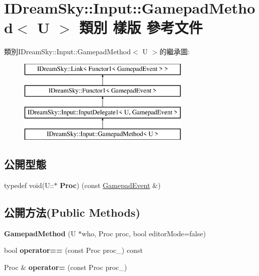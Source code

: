 \hypertarget{class_i_dream_sky_1_1_input_1_1_gamepad_method}{}\section{I\+Dream\+Sky\+:\+:Input\+:\+:Gamepad\+Method$<$ U $>$ 類別 樣版 參考文件}
\label{class_i_dream_sky_1_1_input_1_1_gamepad_method}
類別\+I\+Dream\+Sky\+:\+:Input\+:\+:Gamepad\+Method$<$ U $>$的繼承圖\+:\begin{figure}[H]
\begin{center}
\leavevmode
\includegraphics[height=4.000000cm]{class_i_dream_sky_1_1_input_1_1_gamepad_method}
\end{center}
\end{figure}
\subsection*{公開型態}
\begin{DoxyCompactItemize}
\item 
typedef void(U\+::$\ast$ {\bfseries Proc}) (const \hyperlink{class_i_dream_sky_1_1_input_1_1_gamepad_event}{Gamepad\+Event} \&)\hypertarget{class_i_dream_sky_1_1_input_1_1_gamepad_method_ab743cde604d2da741f306c7950c1ef01}{}\label{class_i_dream_sky_1_1_input_1_1_gamepad_method_ab743cde604d2da741f306c7950c1ef01}

\end{DoxyCompactItemize}
\subsection*{公開方法(Public Methods)}
\begin{DoxyCompactItemize}
\item 
{\bfseries Gamepad\+Method} (U $\ast$who, Proc proc, bool editor\+Mode=false)\hypertarget{class_i_dream_sky_1_1_input_1_1_gamepad_method_aac28e07d9407986fa910ce849e0fb7f2}{}\label{class_i_dream_sky_1_1_input_1_1_gamepad_method_aac28e07d9407986fa910ce849e0fb7f2}

\item 
bool {\bfseries operator==} (const Proc proc\+\_\+) const \hypertarget{class_i_dream_sky_1_1_input_1_1_gamepad_method_a7abd2f751d35625b5927fa56c6dd6349}{}\label{class_i_dream_sky_1_1_input_1_1_gamepad_method_a7abd2f751d35625b5927fa56c6dd6349}

\item 
Proc \& {\bfseries operator=} (const Proc proc\+\_\+)\hypertarget{class_i_dream_sky_1_1_input_1_1_gamepad_method_a3acbc0a8c76fbeb2addafd1cc939323a}{}\label{class_i_dream_sky_1_1_input_1_1_gamepad_method_a3acbc0a8c76fbeb2addafd1cc939323a}

\end{DoxyCompactItemize}


